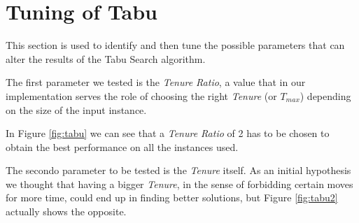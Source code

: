 \section{Tuning of Tabu}

This section is used to identify and then tune the possible parameters that can alter the results of the Tabu Search algorithm.



The first parameter we tested is the \textit{Tenure Ratio}, a value that in our implementation serves the role of choosing the right \textit{Tenure} (or $T_{max}$) depending on the size of the input instance.

In Figure \ref{fig:tabu} we can see that a \textit{Tenure Ratio} of 2 has to be chosen to obtain the best performance on all the instances used.



The secondo parameter to be tested is the \textit{Tenure} itself. As an initial hypothesis we thought that having a bigger \textit{Tenure}, in the sense of forbidding certain moves for more time, could end up in finding better solutions, but Figure \ref{fig:tabu2} actually shows the opposite.



